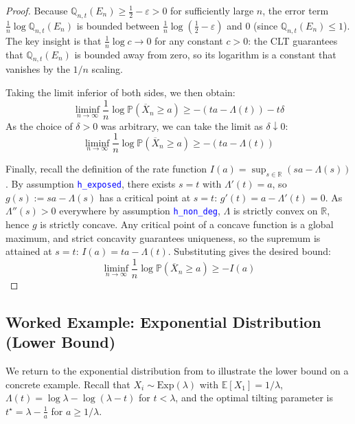 \documentclass{article}
\newcommand{\leancode}[1]{\textcolor{blue}{\nolinkurl{#1}}}
\newcommand{\E}{\mathbb{E}}
\renewcommand{\P}{\mathbb{P}}
\newcommand{\Q}{\mathbb{Q}}
\newcommand{\R}{\mathbb{R}}
\begin{document}
\begin{proof}
  Because $\Q_{n,t}(E_n) \ge \frac{1}{2} - \varepsilon > 0$ for sufficiently large $n$, the error term $\frac{1}{n} \log \Q_{n,t}(E_n)$ is bounded between $\frac{1}{n} \log \left(\frac{1}{2}-\varepsilon\right)$ and $0$ (since $\Q_{n,t}(E_n) \le 1$). The key insight is that $\frac{1}{n} \log c \to 0$ for any constant $c > 0$: the CLT guarantees that $\Q_{n,t}(E_n)$ is bounded away from zero, so its logarithm is a constant that vanishes by the $1/n$ scaling.

  Taking the limit inferior of both sides, we then obtain:
  \begin{equation}
    \liminf_{n \to \infty} \frac{1}{n} \log \P(\overline{X}_n \ge a) \ge -(ta - \Lambda(t)) - t\delta
  \end{equation}
  As the choice of $\delta > 0$ was arbitrary, we can take the limit as $\delta \downarrow 0$:
  \begin{equation}
    \liminf_{n \to \infty} \frac{1}{n} \log \P(\overline{X}_n \ge a) \ge -(ta - \Lambda(t))
  \end{equation}

  Finally, recall the definition of the rate function $I(a) = \sup_{s \in \R} (sa - \Lambda(s))$.
  By assumption \leancode{h\_exposed}, there exists $s = t$ with $\Lambda'(t) = a$, so $g(s) := sa - \Lambda(s)$ has a critical point at $s = t$:
  $g'(t) = a - \Lambda'(t) = 0$.
  As $\Lambda''(s) > 0$ everywhere by assumption \leancode{h\_non\_deg}, $\Lambda$ is strictly convex on $\R$, hence $g$ is strictly concave.
  Any critical point of a concave function is a global maximum, and strict concavity guarantees uniqueness, so the supremum is attained at $s = t$:
  $I(a) = ta - \Lambda(t)$. Substituting gives the desired bound:
  \begin{equation}
    \liminf_{n \to \infty} \frac{1}{n} \log \P(\overline{X}_n \ge a) \ge -I(a)
  \end{equation}
\end{proof}

\subsection{Worked Example: Exponential Distribution (Lower Bound)}
\label{subsec:worked-example-lbd}

We return to the exponential distribution from  to illustrate the lower bound on a concrete example.
Recall that $X_i \sim \text{Exp}(\lambda)$ with $\E[X_1] = 1/\lambda$, $\Lambda(t) = \log \lambda - \log(\lambda - t)$ for $t < \lambda$, and the optimal tilting parameter is
$t^\star = \lambda - \frac{1}{a}$ for $a \ge 1/\lambda$.
\end{document}
